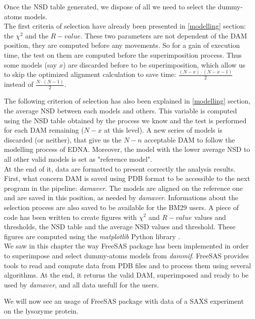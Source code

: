 \documentclass[a4paper, 11pt]{report}
\begin{document}
Once the NSD table generated, we dispose of all we need to select the 
dummy-atoms models.\\
The first criteria of selection have already been presented in 
\ref{modelling} section: the $\chi^2$ and the $R-value$. 
These two parameters are not dependent of the DAM position, they are 
computed before any movements. 
So for a gain of execution time, the test on them are computed before 
the superimposition process. 
Thus some models (say $x$) are discarded before to be superimposition, 
which allow us to skip the optimized alignment calculation to save 
time: $\frac{(N-x) \cdot (N-x-1)}{2}$ instead of 
$\frac{N \cdot (N-1)}{2}$.

The following criterion of selection has also been explained in 
\ref{modelling} section, the average NSD between each models and 
others. 
This variable is computed using the NSD table obtained by the process 
we know and the test is performed for each DAM remaining ($N-x$ at 
this level). 
A new series of models is discarded (or neither), that give us the 
$N-n$ acceptable DAM to follow the modelling process of EDNA. 
Moreover, the model with the lower average NSD to all other valid 
models is set as "reference model".\\

At the end of it, data are formatted to present correctly the analysis 
results. 
First, what concern DAM is saved using PDB format to be accessible to 
the next program in the pipeline: \textit{damaver}. 
The models are aligned on the reference one and are saved in this 
position, as needed by \textit{damaver}. 
Informations about the selection process are also saved to be 
available for the BM29 users. 
A piece of code has been written to create figures with $\chi^2$ and 
$R-value$ values and thresholds, the NSD table and the average NSD 
values and threshold. 
These figures are computed using the \textit{matplotlib} Python 
library \cite{matplotlib}.\\

We saw in this chapter the way FreeSAS package has been implemented in 
order to superimpose and select dummy-atoms models from 
\textit{dammif}. 
FreeSAS provides tools to read and compute data from PDB files and to 
process them using several algorithms. 
At the end, it returns the valid DAM, superimposed and ready to be 
used by \textit{damaver}, and all data usefull for the users.

We will now see an usage of FreeSAS package with data of a SAXS 
experiment on the lysozyme protein.
\end{document}
